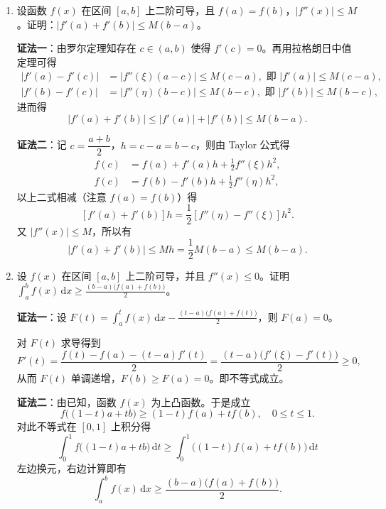 \documentclass[a4paper,11pt]{ctexart}
\newcommand{\dd}{\,\mathrm{d}}
\newcommand{\score}[1]{\hfill{\text{（#1 分）}}}
\begin{document}
\begin{enumerate}[label=\arabic*., start=19, leftmargin=2em, itemsep=1.0em, topsep=0.6em]
  \item 设函数 $f(x)$ 在区间 $[a,b]$ 上二阶可导，且 $f(a)=f(b)$，$|f''(x)|\le M$。证明：$|f'(a)+f'(b)|\le M(b-a)$。

  \textbf{证法一}：由罗尔定理知存在 $c\in(a,b)$ 使得 $f'(c)=0$。再用拉格朗日中值定理可得 \score{2}
  \begin{align*}
    |f'(a)-f'(c)| &= |f''(\xi)(a-c)| \le M(c-a), \text{ 即 } |f'(a)|\le M(c-a), \\
    |f'(b)-f'(c)| &= |f''(\eta)(b-c)| \le M(b-c), \text{ 即 } |f'(b)|\le M(b-c), \tag*{（4 分）}
  \end{align*}
  进而得
  \[
    |f'(a)+f'(b)| \le |f'(a)| + |f'(b)| \le M(b-a). \tag*{（5 分）}
  \]

  \textbf{证法二}：记 $c=\dfrac{a+b}{2}$，$h=c-a=b-c$，则由 Taylor 公式得
  \begin{align*}
    f(c) &= f(a) + f'(a)h + \frac{1}{2}f''(\xi)h^2, \\
    f(c) &= f(b) - f'(b)h + \frac{1}{2}f''(\eta)h^2, \tag*{（4 分）}
  \end{align*}
  以上二式相减（注意 $f(a)=f(b)$）得
  \[
    [f'(a)+f'(b)]h = \frac{1}{2}[f''(\eta)-f''(\xi)]h^2.
  \]
  又 $|f''(x)|\le M$，所以有
  \[
    |f'(a)+f'(b)| \le Mh = \frac{1}{2}M(b-a) \le M(b-a). \tag*{（5 分）}
  \]

  \item 设 $f(x)$ 在区间 $[a,b]$ 上二阶可导，并且 $f''(x)\le 0$。证明 $\displaystyle\int_a^b f(x)\dd x \ge \frac{(b-a)\bigl(f(a)+f(b)\bigr)}{2}$。

  \textbf{证法一}：设 $F(t)=\displaystyle\int_a^t f(x)\dd x - \frac{(t-a)\bigl(f(a)+f(t)\bigr)}{2}$，则 $F(a)=0$。\score{2}

  对 $F(t)$ 求导得到
  \[
    F'(t) = \frac{f(t)-f(a)-(t-a)f'(t)}{2} = \frac{(t-a)\bigl(f'(\xi)-f'(t)\bigr)}{2} \ge 0, \tag*{（4 分）}
  \]
  从而 $F(t)$ 单调递增，$F(b)\ge F(a)=0$。即不等式成立。\score{5}

  \textbf{证法二}：由已知，函数 $f(x)$ 为上凸函数。于是成立
  \[
    f\bigl((1-t)a+tb\bigr) \ge (1-t)f(a) + tf(b),\quad 0\le t\le 1. \tag*{（2 分）}
  \]
  对此不等式在 $[0,1]$ 上积分得
  \[
    \int_0^1 f\bigl((1-t)a+tb\bigr)\dd t \ge \int_0^1 \bigl((1-t)f(a)+tf(b)\bigr)\dd t \tag*{（4 分）}
  \]
  左边换元，右边计算即有
  \[
    \int_a^b f(x)\dd x \ge \frac{(b-a)\bigl(f(a)+f(b)\bigr)}{2}. \tag*{（5 分）}
  \]
\end{enumerate}
\end{document}
